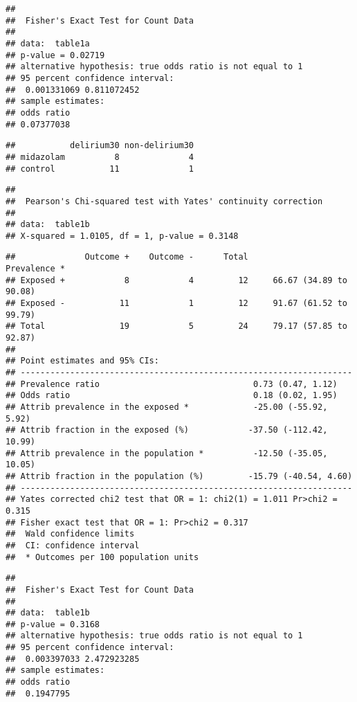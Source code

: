 \documentclass[
]{article}
\begin{document}
\begin{verbatim}
## 
##  Fisher's Exact Test for Count Data
## 
## data:  table1a
## p-value = 0.02719
## alternative hypothesis: true odds ratio is not equal to 1
## 95 percent confidence interval:
##  0.001331069 0.811072452
## sample estimates:
## odds ratio 
## 0.07377038
\end{verbatim}

\begin{verbatim}
##           delirium30 non-delirium30
## midazolam          8              4
## control           11              1
\end{verbatim}

\begin{verbatim}
## 
##  Pearson's Chi-squared test with Yates' continuity correction
## 
## data:  table1b
## X-squared = 1.0105, df = 1, p-value = 0.3148
\end{verbatim}

\begin{verbatim}
##              Outcome +    Outcome -      Total               Prevalence *
## Exposed +            8            4         12     66.67 (34.89 to 90.08)
## Exposed -           11            1         12     91.67 (61.52 to 99.79)
## Total               19            5         24     79.17 (57.85 to 92.87)
## 
## Point estimates and 95% CIs:
## -------------------------------------------------------------------
## Prevalence ratio                               0.73 (0.47, 1.12)
## Odds ratio                                     0.18 (0.02, 1.95)
## Attrib prevalence in the exposed *             -25.00 (-55.92, 5.92)
## Attrib fraction in the exposed (%)            -37.50 (-112.42, 10.99)
## Attrib prevalence in the population *          -12.50 (-35.05, 10.05)
## Attrib fraction in the population (%)         -15.79 (-40.54, 4.60)
## -------------------------------------------------------------------
## Yates corrected chi2 test that OR = 1: chi2(1) = 1.011 Pr>chi2 = 0.315
## Fisher exact test that OR = 1: Pr>chi2 = 0.317
##  Wald confidence limits
##  CI: confidence interval
##  * Outcomes per 100 population units
\end{verbatim}

\begin{verbatim}
## 
##  Fisher's Exact Test for Count Data
## 
## data:  table1b
## p-value = 0.3168
## alternative hypothesis: true odds ratio is not equal to 1
## 95 percent confidence interval:
##  0.003397033 2.472923285
## sample estimates:
## odds ratio 
##  0.1947795
\end{verbatim}
\end{document}
